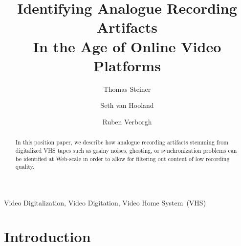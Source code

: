 \documentclass[runningheads,a4paper]{llncs}
\newcommand{\keywords}[1]{\par\addvspace\baselineskip
\noindent\keywordname\enspace\ignorespaces#1}
\begin{document}
\mainmatter

\title{Identifying Analogue Recording Artifacts\\
In the Age of Online Video Platforms}


\author{Thomas Steiner \and
        Seth van Hooland \and
        Ruben Verborgh}


\maketitle

\setcounter{footnote}{0}

\begin{abstract}
In this position paper, we describe how analogue recording artifacts
stemming from digitalized VHS tapes such as
grainy noises, ghosting, or synchronization problems
can be identified at Web-scale in order to
allow for filtering out content of low recording quality.
\end{abstract}

\keywords{Video Digitalization, Video Digitation, Video Home System~(VHS)}

\section{Introduction}
\end{document}
